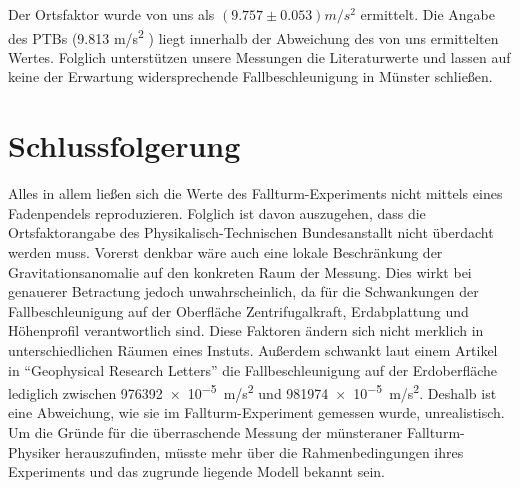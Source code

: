 \documentclass[
	a4paper,
	12pt,
	pagesize,
	ngerman
]{scrartcl}
\begin{document}
	Der Ortsfaktor wurde von uns als $(9.757 \pm 0.053) \si{m/s^2}$ ermittelt. Die Angabe des PTBs (9.813 \si{m/s^2} ) liegt innerhalb der Abweichung des von uns ermittelten Wertes. Folglich unterstützen unsere Messungen die Literaturwerte und lassen auf keine der Erwartung widersprechende Fallbeschleunigung in Münster schließen.

	\section{Schlussfolgerung}
	Alles in allem ließen sich die Werte des Fallturm-Experiments nicht mittels eines Fadenpendels reproduzieren. Folglich ist davon auszugehen, dass die Ortsfaktorangabe des Physikalisch-Technischen Bundesanstallt nicht überdacht werden muss. Vorerst denkbar wäre auch eine lokale Beschränkung der Gravitationsanomalie auf den konkreten Raum der Messung. Dies wirkt bei genauerer Betractung jedoch unwahrscheinlich, da für die Schwankungen der Fallbeschleunigung auf der Oberfläche Zentrifugalkraft, Erdabplattung und Höhenprofil verantwortlich sind. Diese Faktoren ändern sich nicht merklich in unterschiedlichen Räumen eines Instuts. Außerdem schwankt laut einem Artikel in \enquote{Geophysical Research Letters} \cite{Fall} die Fallbeschleunigung auf der Erdoberfläche lediglich zwischen \SI{976392e-5}{m/s^2} und \SI{981974e-5}{m/s^2}. %
	 Deshalb ist eine Abweichung, wie sie im Fallturm-Experiment gemessen wurde, unrealistisch.  Um die Gründe für die überraschende Messung der münsteraner Fallturm-Physiker herauszufinden, müsste mehr über die Rahmenbedingungen ihres Experiments und das zugrunde liegende Modell bekannt sein.



\end{document}
